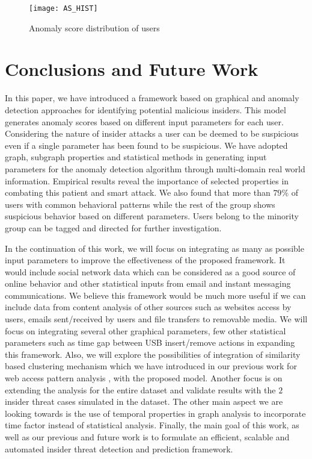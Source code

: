 \documentclass[conference,draftclsnofoot,onecolumn]{IEEEtran}%
\begin{document}
\begin{figure}[h]
\centering
\texttt{[image: AS\_HIST]}
\vspace{-5pt}
\caption{Anomaly score distribution of users}
\label{figure 10}
\vspace{-5pt}
\end{figure}

\section{Conclusions and Future Work}
In this paper, we have introduced a framework based on graphical and anomaly detection approaches for identifying potential malicious insiders. This model generates anomaly scores based on different input parameters for each user. Considering the nature of insider attacks a user can be deemed to be suspicious even if a single parameter has been found to be suspicious. We have adopted graph, subgraph properties and statistical methods in generating input parameters for the anomaly detection algorithm through multi-domain real world information. Empirical results reveal the importance of selected properties in combating this patient and smart attack. We also found that more than $79\%$ of users with common behavioral patterns while the rest of the group shows suspicious behavior based on different parameters. Users belong to the minority group can be tagged and directed for further investigation.

In the continuation of this work, we will focus on integrating as many as possible input parameters to improve the effectiveness of the proposed framework. It would include social network data which can be considered as a good source of online behavior and other statistical inputs from email and instant messaging communications. We believe this framework would be much more useful if we can include data from content analysis of other sources such as websites access by users, emails sent/received by users and file transfers to removable media. We will focus on integrating several other graphical parameters, few other statistical parameters such as time gap between USB insert/remove actions in expanding this framework. Also, we will explore the possibilities of integration of similarity based clustering mechanism which we have introduced in our previous work for web access pattern analysis \cite{Anagi}, with the proposed model. Another focus is on extending the analysis for the entire dataset and validate results with the $2$ insider threat cases simulated in the dataset. The other main aspect we are looking towards is the use of temporal properties in graph analysis to incorporate time factor instead of statistical analysis. Finally, the main goal of this work, as well as our previous and future work is to formulate an efficient, scalable and automated insider threat detection and prediction framework.
\end{document}
